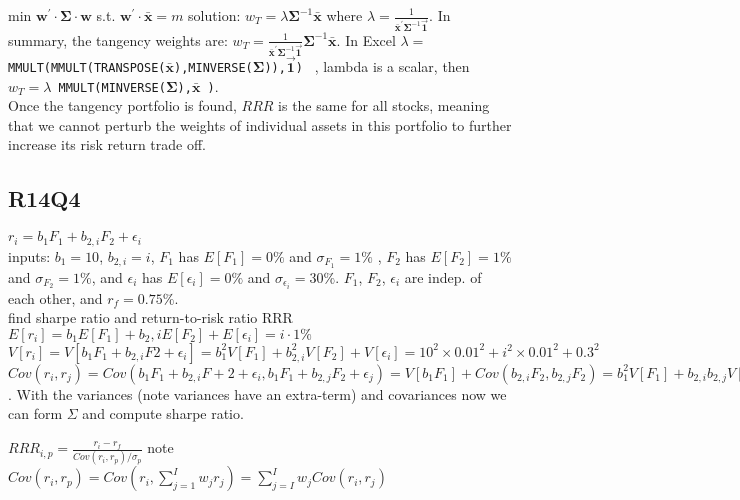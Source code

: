 min $\bm{w}^\prime \cdot \bm{\Sigma} \cdot \bm{w} $  s.t. $\bm{w}^\prime \cdot \bm{\bar{x}} = m  $ solution: $w_T=\lambda \bm{\Sigma}^{-1} \bm{\bar{x}}$ 
where $\lambda = \frac{1}{\bm{\bar{x}^\prime}  \bm{\Sigma}^{-1}  \bm{\vec{1}}} $. 
In summary, the tangency weights are: $w_T=\frac{1}{\bm{\bar{x}^\prime}  \bm{\Sigma}^{-1}  \bm{\vec{1}}} \bm{\Sigma}^{-1} \bm{\bar{x}}$.
In Excel  \texttt{$\lambda=$MMULT(MMULT(TRANSPOSE($\bm{\bar{x}}$),MINVERSE($\bm{\Sigma}$)),$\bm{\vec{1}}$)  } , lambda is a scalar, 
then \\
\texttt{$w_T=\lambda$ MMULT(MINVERSE($\bm{\Sigma}$),$\bm{\bar{x}}$ )}. \\
Once the tangency portfolio is found, $RRR$ is the same for all stocks, meaning that we cannot perturb the weights of individual assets in this portfolio to further increase its risk return trade off.



\subsection*{R14Q4}
$r_i = b_{1} F_1 + b_{2,i} F_2 + \epsilon_i $\\
inputs:
$b_1=10$, $b_{2,i}=i$, 
$F_1$ has $E[F_1]=0\%$ and $\sigma_{F_1}=1\%$ , $F_2$ has  $E[F_2]=1\%$ and $\sigma_{F_2}=1\%$, and $\epsilon_i$ has $E[\epsilon_i]=0\%$ and $\sigma_{\epsilon_i}=30\%$. $F_1$, $F_2$, $\epsilon_i$ are indep. of each other, and $r_f=0.75\%$.\\
find sharpe ratio and return-to-risk ratio RRR \\
$E[r_i] = b_1E[F_1] + b_2,iE[F_2] + E[\epsilon_i]=i \cdot 1\%$ \\

$V [r_i] = V [b_1F_1 + b_{2,i}F2 + \epsilon_i]= b_1^2V[F_1] + b_{2,i}^2V [F_2] + V [\epsilon_i] =  10^2  \times 0.01^2 + i^2  \times 0.01^2 + 0.3^2$ \\
$Cov(r_i,r_j) = Cov(b_1 F_1 + b_{2,i}F+2 + \epsilon_i, b_1 F_1 + b_{2,j} F_2 + \epsilon_j) = V[b_1 F_1] + Cov(b_{2,i}F_2 , b_{2,j} F_2 ) = b_1^2 V[F_1] + b_{2,i}b_{2,j}V[F_2] = 10^2 \times 0.01^2 + i \times j \times 0.01^2 $. With the variances (note variances have an extra-term) and covariances now we can form $\Sigma$ and compute sharpe ratio.

$RRR_{i,p} = \frac{r_i-r_f}{Cov(r_i,r_p)/\sigma_p}$  note $Cov(r_i, r_p) = Cov(r_i,\sum_{j=1}^{I} w_j r_j) = \sum_{j=I}^{I}w_j Cov(r_i, r_j) $ \\

